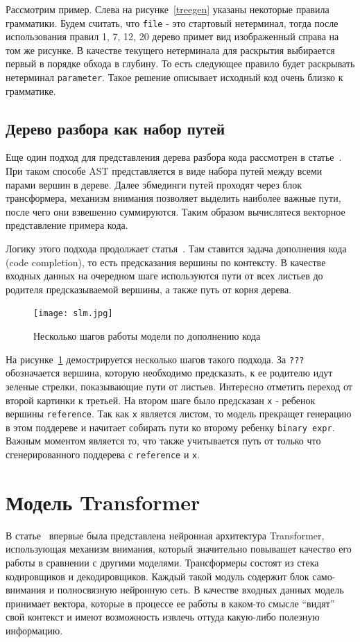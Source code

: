 \documentclass[times,specification,annotation]{itmo-student-thesis}
\begin{document}
Рассмотрим пример. Слева на рисунке~\ref{treegen} указаны некоторые правила грамматики. Будем считать, что \texttt{file} - это стартовый нетерминал, тогда после использования правил 1, 7, 12, 20 дерево примет вид изображенный справа на том же рисунке. В качестве текущего нетерминала для раскрытия выбирается первый в порядке обхода в глубину. То есть следующее правило будет раскрывать нетерминал \texttt{parameter}. Такое решение описывает исходный код очень близко к грамматике.

\subsection{Дерево разбора как набор путей}\label{sec:slm}
Еще один подход для представления дерева разбора кода рассмотрен в статье~\cite{code2vec}. При таком способе AST представляется в виде набора путей между всеми парами вершин в дереве. Далее эбмединги путей проходят через блок трансформера, механизм внимания позволяет выделить наиболее важные пути, после чего они взвешенно суммируются. Таким образом вычислятеся векторное представление примера кода.

Логику этого подхода продолжает статья~\cite{slm}. Там ставится задача дополнения кода (code completion), то есть предсказания вершины по контексту. В качестве входных данных на очередном шаге используются пути от всех листьев до родителя предсказываемой вершины, а также путь от корня дерева.

\begin{figure}[!h]
    \caption{Несколько шагов работы модели по дополнению кода}\label{slm}
    \centering
    \texttt{[image: slm.jpg]}
\end{figure}

На рисунке~\ref{slm} демострируется несколько шагов такого подхода. За \texttt{???} обозначается вершина, которую необходимо предсказать, к ее родителю идут зеленые стрелки, показывающие пути от листьев. Интересно отметить переход от второй картинки к третьей. На втором шаге было предсказан \texttt{x} - ребенок вершины \texttt{reference}. Так как \texttt{x} является листом, то модель прекращет генерацию в этом поддереве и начитает собирать пути ко второму ребенку \texttt{binary expr}. Важным моментом является то, что также учитывается путь от только что сгенерированного поддерева с \texttt{reference} и \texttt{x}.

\section{Модель Transformer}\label{transformers}
В статье~\cite{trans-paper} впервые была представлена нейронная архитектура Transformer, использующая механизм внимания, который значительно повывашет качество его работы в сравнении с другими моделями. Трансформеры состоят из стека кодировщиков и декодировщиков. Каждый такой модуль содержит блок само-внимания и полносвязную нейронную сеть. В качестве входных данных модель принимает вектора, которые в процессе ее работы в каком-то смысле ``видят'' свой контекст и имеют возможность извлечь оттуда какую-либо полезную информацию.
\end{document}
